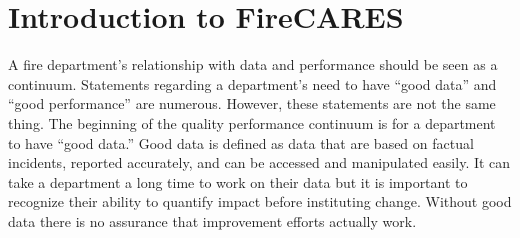 \documentclass[12pt,oneside]{book}
\begin{document}



\frontmatter

\begin{minipage}[t][9in][s]{6.25in}



\vfill


\titlesigs

\end{minipage}

\frontmatter

\pagestyle{plain}

\newpage

\cleardoublepage
\renewcommand*\contentsname{\color{brown}Contents}
\tableofcontents

\newpage
\mainmatter

\chapter{Introduction to FireCARES}
A fire department's relationship with data and performance should be seen as a continuum. Statements regarding a department's need to have ``good data'' and ``good performance'' are numerous. However, these statements are not the same thing. The beginning of the quality performance continuum is for a department to have ``good data.'' Good data is defined as data that are based on factual incidents, reported accurately, and can be accessed and manipulated easily. It can take a department a long time to work on their data but it is important to recognize their ability to quantify impact before instituting change. Without good data there is no assurance that improvement efforts actually work.
\end{document}
